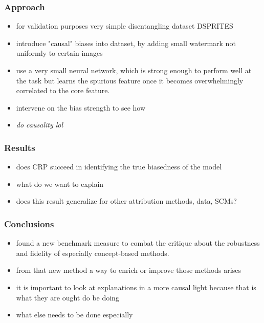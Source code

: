 \subsubsection*{Approach}
\begin{itemize}
    \item for validation purposes very simple disentangling dataset DSPRITES
    \item introduce "causal" biases into dataset, by adding small watermark not uniformly to certain images
    \item use a very small neural network, which is strong enough to perform well at the task but learns the spurious feature once it becomes overwhelmingly correlated to the core feature.
    \item intervene on the bias strength to see how 
    \item \textit{do causality lol}
\end{itemize}

\subsubsection*{Results}
\begin{itemize}
    \item does CRP succeed in identifying the true biasedness of the model
    \item what do we want to explain
    \item does this result generalize for other attribution methods, data, SCMs?
\end{itemize}

\subsubsection*{Conclusions}
\begin{itemize}
    \item found a new benchmark measure to combat the critique about the robustness and fidelity of especially concept-based methods.
    \item from that new method a way to enrich or improve those methods arises
    \item it is important to look at explanations in a more causal light because that is what they are ought do be doing
    \item what else needs to be done especially
\end{itemize}
